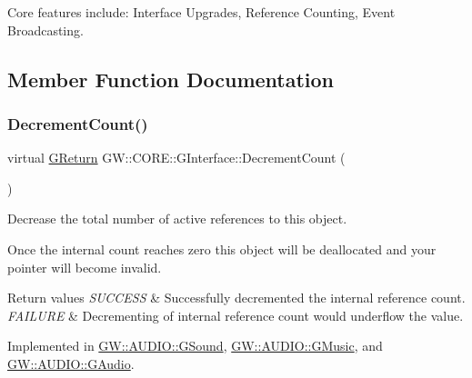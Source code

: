 Core features include\+: Interface Upgrades, Reference Counting, Event Broadcasting. 

\subsection{Member Function Documentation}
\mbox{\label{class_g_w_1_1_c_o_r_e_1_1_g_interface_a19a368c77ad0aa7f49b5a4f772f173ba}} 
\subsubsection{\texorpdfstring{Decrement\+Count()}{DecrementCount()}}
{\footnotesize\ttfamily virtual \mbox{\hyperlink{namespace_g_w_a67a839e3df7ea8a5c5686613a7a3de21}{G\+Return}} G\+W\+::\+C\+O\+R\+E\+::\+G\+Interface\+::\+Decrement\+Count (\begin{DoxyParamCaption}{ }\end{DoxyParamCaption})\hspace{0.3cm}{\ttfamily [pure virtual]}}



Decrease the total number of active references to this object. 

Once the internal count reaches zero this object will be deallocated and your pointer will become invalid.


\begin{DoxyRetVals}{Return values}
{\em S\+U\+C\+C\+E\+SS} & Successfully decremented the internal reference count. \\
\hline
{\em F\+A\+I\+L\+U\+RE} & Decrementing of internal reference count would underflow the value. \\
\hline
\end{DoxyRetVals}


Implemented in \mbox{\hyperlink{class_g_w_1_1_a_u_d_i_o_1_1_g_sound_afa9587ca984fc5ad2d5cdd47c3aebbcb}{G\+W\+::\+A\+U\+D\+I\+O\+::\+G\+Sound}}, \mbox{\hyperlink{class_g_w_1_1_a_u_d_i_o_1_1_g_music_a1385376fffc42c40f5922b4722d10b5c}{G\+W\+::\+A\+U\+D\+I\+O\+::\+G\+Music}}, and \mbox{\hyperlink{class_g_w_1_1_a_u_d_i_o_1_1_g_audio_a9bdc3d4a8668b702db98dde91a0fa423}{G\+W\+::\+A\+U\+D\+I\+O\+::\+G\+Audio}}.

\mbox{\label{class_g_w_1_1_c_o_r_e_1_1_g_interface_aacf5834174a7024f8a3c361122ee9e76}} 
